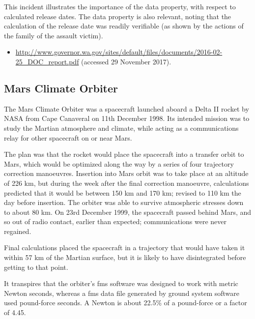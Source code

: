This incident illustrates the importance of the  \gls{data property}, with respect to calculated release dates. The  \gls{data property} is also relevant, noting that the calculation of the release date was readily verifiable (as shown by the actions of the family of the assault victim).

\begin{samepage}
\begin{itemize}
	\item \raggedright{\href{http://www.governor.wa.gov/sites/default/files/documents/2016-02-25_DOC_report.pdf}{http://www.governor.wa.gov/sites/default/files/documents/2016-02-25\_DOC\_report.pdf} (accessed 29 November 2017).}
\end{itemize}
\end{samepage}


\subsection{Mars Climate Orbiter} \label{bkm:incacc:marsclimate}
The Mars Climate Orbiter was a spacecraft launched aboard a Delta II rocket by NASA from Cape Canaveral on 11th December 1998. Its intended mission was to study the Martian atmosphere and climate, while acting as a communications relay for other spacecraft on or near Mars.

The plan was that the rocket would place the spacecraft into a transfer orbit to Mars, which would be optimized along the way by a series of four trajectory correction manoeuvres. Insertion into Mars orbit was to take place at an altitude of 226 km, but during the week after the final correction manoeuvre, calculations predicted that it would be between 150 km and 170 km; revised to 110 km the day before insertion. The orbiter was able to survive atmospheric stresses down to about 80 km. On 23rd December 1999, the spacecraft passed behind Mars, and so out of radio contact, earlier than expected; communications were never regained.

Final calculations placed the spacecraft in a trajectory that would have taken it within 57 km of the Martian surface, but it is likely to have disintegrated before getting to that point. 

It transpires that the orbiter's \gls{fms} software was designed to work with metric Newton seconds, whereas a \gls{fms} \cbstart data file \cbend generated by ground system software used pound-force seconds. A Newton is about 22.5\% of a pound-force or a factor of 4.45.

